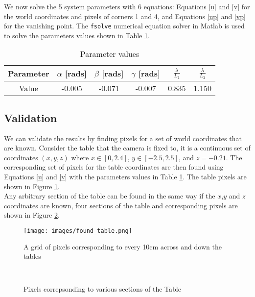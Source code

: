 \documentclass[12pt]{article}
\begin{document}
We now solve the 5 system parameters with 6 equations: Equations \ref{u} and \ref{v} for the world coordinates and pixels of corners 1 and 4, and Equations \ref{up} and \ref{vp} for the vanishing point. The \texttt{fsolve} numerical equation solver in Matlab is used to solve the parameters values shown in Table \ref{table:results}.


\begin{table}[!htb]
\centering
\begin{tabular}{|c|c|c|c|c|c|}
\hline
Parameter & $\alpha$ [rads] & $\beta$ [rads] & $\gamma$ [rads] & $\frac{\lambda}{L_1}$ & $\frac{\lambda}{L_2}$\\
\hline
Value & -0.005 & -0.071 & -0.007 & 0.835 & 1.150 \\
\hline
\end{tabular}
\caption{Parameter values}
\label{table:results}
\end{table}


\subsection{Validation}
We can validate the results by finding pixels for a set of world coordinates that are known. Consider the table that the camera is fixed to, it is a continuous set of coordinates $(x,y,z)$ where $x \in \left[0,2.4\right]$,  $y \in \left[-2.5,2.5\right]$, and $z=-0.21$.  The corresponding set of pixels for the table coordinates are then found using Equations \ref{u} and \ref{v} with the parameters values in Table \ref{table:results}. The table pixels are shown in Figure \ref{fig:result}. \\

Any arbitrary section of the table can be found in the same way if the $x$,$y$ and $z$ coordinates are known, four sections of the table and corresponding pixels are shown in Figure \ref{fig:multi_table}.


\begin{figure}[h]
\centering
\texttt{[image: images/found\_table.png]}
\caption{A grid of pixels corresponding to every 10cm across and down the tables}\label{fig:result}
\end{figure}

\begin{figure}[h]
    \centering
    \qquad
	\\
    \qquad
    \caption{Pixels correpsonding to various sections of the Table}%
    \label{fig:multi_table}%
\end{figure}
\end{document}

